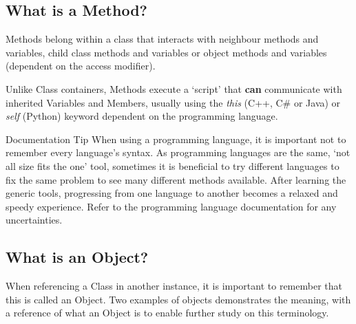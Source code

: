 \documentclass[10pt]{article}
\begin{document}
    \newpage
    \subsection{What is a Method?}
        Methods belong within a class that interacts with neighbour methods and variables, child class methods and variables or object methods and variables (dependent on the access modifier).
        
        Unlike Class containers, Methods execute a `script' that \textbf{can} communicate with inherited Variables and Members, usually using the \textit{this} (C++, C\# or Java) or \textit{self} (Python) keyword dependent on the programming language.

        \begin{tip}{Documentation Tip}
            When using a programming language, it is important not to remember every language's syntax. As programming languages are the same, `not all size fits the one' tool, sometimes it is beneficial to try different languages to fix the same problem to see many different methods available. After learning the generic tools, progressing from one language to another becomes a relaxed and speedy experience. Refer to the programming language documentation for any uncertainties.
        \end{tip}

    \subsection{What is an Object?}
        When referencing a Class in another instance, it is important to remember that this is called an Object. Two examples of objects demonstrates the meaning, with a reference of what an Object is to enable further study on this terminology.
\end{document}

